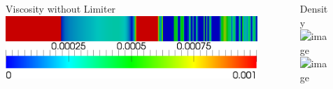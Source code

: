 \documentclass[8pt,xcolor=svgnames]{beamer}
\begin{document}
\begin{frame}
\begin{columns}
\begin{column}{0.3\textwidth}
\begin{figure}[t]
\begin{center}
Viscosity without Limiter
\includegraphics[width=1.0\textwidth]{figs/Sod/Q4nl-50-viscosity.png}
\end{center}
\end{figure}
\end{column}
\begin{column}{0.7\textwidth}
\begin{center}
Density\\
\includegraphics<1>[width=0.8\textwidth]{figs/Sod/Q4-50-Density.png}
\includegraphics<2>[width=0.8\textwidth]{figs/Sod/Q4-50-Density-zoom.png}
\end{center}
\end{column}
\end{columns}
\end{frame}
\end{document}
